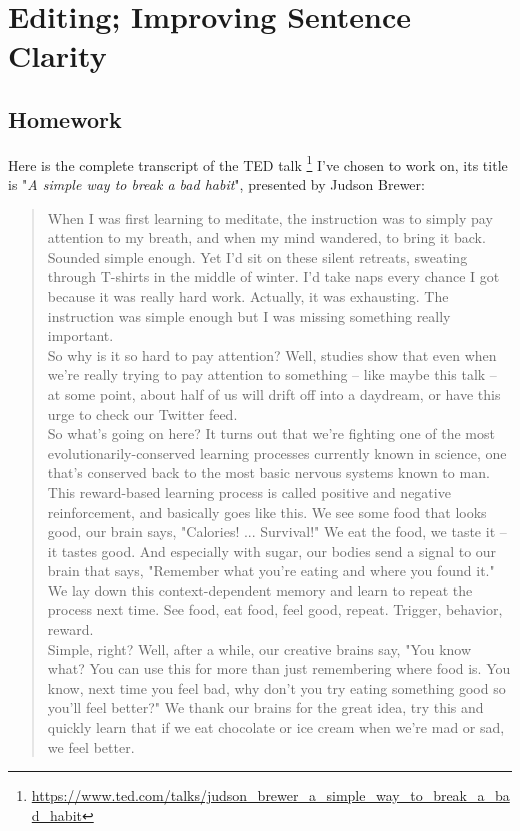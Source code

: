 
\chapter{Editing; Improving Sentence Clarity}

\section{Homework}

Here is the complete transcript of the TED talk
\footnote{\url{https://www.ted.com/talks/judson_brewer_a_simple_way_to_break_a_bad_habit}}
I've chosen to work on, its title is "\emph{A simple way to break a bad habit}", presented by Judson Brewer:
\begin{quote}
When I was first learning to meditate, the instruction was to simply pay attention to my breath, and when my mind wandered, to bring it back.\\
Sounded simple enough. Yet I'd sit on these silent retreats, sweating through T-shirts in the middle of winter. I'd take naps every chance I got because it was really hard work. Actually, it was exhausting. The instruction was simple enough but I was missing something really important.\\
So why is it so hard to pay attention? Well, studies show that even when we're really trying to pay attention to something -- like maybe this talk -- at some point, about half of us will drift off into a daydream, or have this urge to check our Twitter feed.\\
So what's going on here? It turns out that we're fighting one of the most evolutionarily-conserved learning processes currently known in science, one that's conserved back to the most basic nervous systems known to man.\\
This reward-based learning process is called positive and negative reinforcement, and basically goes like this. We see some food that looks good, our brain says, "Calories! ... Survival!" We eat the food, we taste it -- it tastes good. And especially with sugar, our bodies send a signal to our brain that says, "Remember what you're eating and where you found it." We lay down this context-dependent memory and learn to repeat the process next time. See food, eat food, feel good, repeat. Trigger, behavior, reward.\\
Simple, right? Well, after a while, our creative brains say, "You know what? You can use this for more than just remembering where food is. You know, next time you feel bad, why don't you try eating something good so you'll feel better?" We thank our brains for the great idea, try this and quickly learn that if we eat chocolate or ice cream when we're mad or sad, we feel better.\\

\end{quote}

